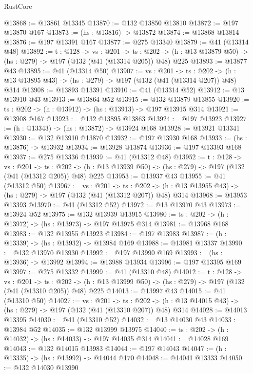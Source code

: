 \begin{lexlean}{RustCore}
\begin{coremodule}
@13868 := @13861 @13345
@13870 := @132 @13850 @13810
@13872 := @197 @13870 @167
@13873 := (hs : @13816) -> @13872
@13874 := @13868 @13814
@13876 := @197 @13391 @167
@13877 := @275 @13340
@13879 := @41 (@13314 @48)
@13892 := {t : @128} ->
  {vs : @201} ->
  {ts : @202} -> (h : @13 @13879 @50) -> (hs : @279) -> @197 (@132 (@41 (@13314 @205)) @48) @225
@13893 := @13877 @43
@13895 := @41 (@13314 @50)
@13907 := {vs : @201} ->
  {ts : @202} -> (h : @13 @13895 @43) -> (hs : @279) -> @197 (@132 (@41 (@13314 @207)) @48) @314
@13908 := @13893 @13391
@13910 := @41 (@13314 @52)
@13912 := @13 @13910 @43
@13913 := @13864 @52
@13915 := @132 @13879 @13855
@13920 := {ts : @202} -> (h : @13912) -> (hs : @13913) -> @197 @13915 @314
@13921 := @13908 @167
@13923 := @132 @13895 @13863
@13924 := @197 @13923
@13927 := (h : @13343) -> (hs : @13872) -> @13924 @168
@13928 := @13921 @13341
@13930 := @132 @13910 @13870
@13932 := @197 @13930 @168
@13933 := (hs : @13876) -> @13932
@13934 := @13928 @13874
@13936 := @197 @13393 @168
@13937 := @275 @13336
@13939 := @41 (@13312 @48)
@13952 := {t : @128} ->
  {vs : @201} ->
  {ts : @202} -> (h : @13 @13939 @50) -> (hs : @279) -> @197 (@132 (@41 (@13312 @205)) @48) @225
@13953 := @13937 @43
@13955 := @41 (@13312 @50)
@13967 := {vs : @201} ->
  {ts : @202} -> (h : @13 @13955 @43) -> (hs : @279) -> @197 (@132 (@41 (@13312 @207)) @48) @314
@13968 := @13953 @13393
@13970 := @41 (@13312 @52)
@13972 := @13 @13970 @43
@13973 := @13924 @52
@13975 := @132 @13939 @13915
@13980 := {ts : @202} -> (h : @13972) -> (hs : @13973) -> @197 @13975 @314
@13981 := @13968 @168
@13983 := @132 @13955 @13923
@13984 := @197 @13983
@13987 := (h : @13339) -> (hs : @13932) -> @13984 @169
@13988 := @13981 @13337
@13990 := @132 @13970 @13930
@13992 := @197 @13990 @169
@13993 := (hs : @13936) -> @13992
@13994 := @13988 @13934
@13996 := @197 @13395 @169
@13997 := @275 @13332
@13999 := @41 (@13310 @48)
@14012 := {t : @128} ->
  {vs : @201} ->
  {ts : @202} -> (h : @13 @13999 @50) -> (hs : @279) -> @197 (@132 (@41 (@13310 @205)) @48) @225
@14013 := @13997 @43
@14015 := @41 (@13310 @50)
@14027 := {vs : @201} ->
  {ts : @202} -> (h : @13 @14015 @43) -> (hs : @279) -> @197 (@132 (@41 (@13310 @207)) @48) @314
@14028 := @14013 @13395
@14030 := @41 (@13310 @52)
@14032 := @13 @14030 @43
@14033 := @13984 @52
@14035 := @132 @13999 @13975
@14040 := {ts : @202} -> (h : @14032) -> (hs : @14033) -> @197 @14035 @314
@14041 := @14028 @169
@14043 := @132 @14015 @13983
@14044 := @197 @14043
@14047 := (h : @13335) -> (hs : @13992) -> @14044 @170
@14048 := @14041 @13333
@14050 := @132 @14030 @13990

\end{coremodule}
\end{lexlean}
